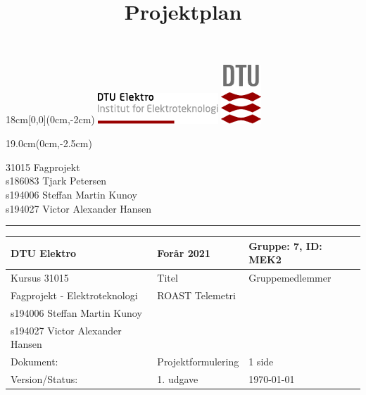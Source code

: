 \documentclass[]{article}
\title{Projektplan}
\begin{document}
\thispagestyle{empty}
\vspace*{-1.9cm}
\begin{textblock*}{18cm}[0,0](0cm,-2cm) %
  \noindent
  \includegraphics[width=4.5cm,valign=t]{documentation/resources/tex_dtu_elektro_a.pdf}
  \hspace*{10.6cm}
  \includegraphics[width=1.5cm,valign=t]{documentation/resources/tex_dtu_logo.pdf}
\end{textblock*}
\begin{textblock*}{19.0cm}(0cm,-2.5cm) %
\begin{center}
  {\color{dtured}\large31015 Fagprojekt}\\
  \normalsize
  s186083 Tjark Petersen\\
  s194006 Steffan Martin Kunoy\\
  s194027 Victor Alexander Hansen\\
\end{center}
\end{textblock*}
\vspace{1mm}
{\hspace*{-0.1cm}
\color{dtured}\noindent \rule{16.8cm}{5pt}}
 
\begin{table}[H]
     \centering
     \begin{tabularx}{\textwidth}{|X|X|X|}
     \hline
          DTU Elektro&Forår 2021 & Gruppe: 7, ID: MEK2 \\\hline
          Kursus 31015 & Titel & Gruppemedlemmer \\\hline
          Fagprojekt - Elektroteknologi & ROAST Telemetri & \begin{tabular}{l} s186083 Tjark Petersen\\s194006 Steffan Martin Kunoy\\s194027 Victor Alexander Hansen \end{tabular}\\\hline
          Dokument:& Projektformulering & 1 side\\\hline 
          Version/Status: & 1. udgave &\today\\\hline
     \end{tabularx}
 \end{table}
 
\end{document}
